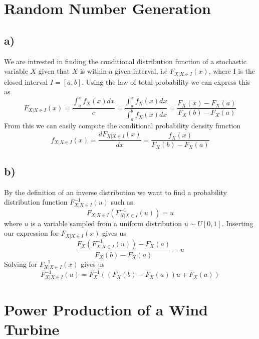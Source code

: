 \documentclass[a4paper]{article}
\begin{document}
 
\section*{Random Number Generation}

\subsection*{a)}
We are intrested in finding the conditional distribution function of a stochastic variable $X$ given that $X$ is within a given interval, i.e $F_{X|X\in I}(x)$, where I is the closed interval $I = [a,b]$. Using the law of total probability we can express this as
\begin{equation}
    F_{X|X\in{I}}(x) = \frac{\int_a^xf_X(x)dx}{c} = \frac{\int_a^xf_X(x)dx}{\int_a^bf_X(x)dx} = \frac{F_X(x)-F_X(a)}{F_X(b)-F_X(a)}
\end{equation}
From this we can easily compute the conditional probability density function
\begin{equation}
    f_{X|X\in{I}}(x) = \frac{dF_{X|X\in{I}}(x)}{dx} = \frac{f_X(x)}{F_X(b)-F_X(a)}
\end{equation}

\subsection*{b)}
By the definition of an inverse distribution we want to find a probability distribution function $F_{X|X \in I}^{-1}(u)$ such as:
\begin{equation}
    F_{X|X \in I}(F_{X|X \in I}^{-1}(u)) = u
\end{equation}
where $u$ is a variable sampled from a uniform distribution $u \sim U[0,1]$. Inserting our expression for $F_{X|X \in I}(x)$ gives us
\begin{equation}
    \frac{F_X(F_{X|X\in I}^{-1}(u))-F_X(a)}{F_X(b)-F_X(a)} = u
\end{equation}
Solving for $F_{X|X\in I}^{-1}(x)$ gives us
\begin{equation}
    F_{X|X\in I}^{-1}(u) = F_X^{-1}((F_X(b)-F_X(a))u + F_X(a))
\end{equation}


\newpage
\section*{Power Production of a Wind Turbine}
\end{document}
